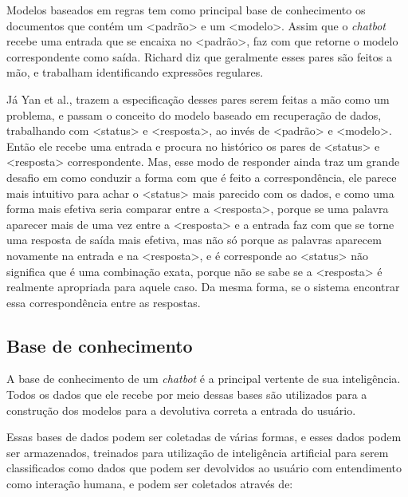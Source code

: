 \documentclass[
	12pt,				%
	oneside,
	a4paper,			%
	english,			%
	french,				%
	spanish,			%
	brazil				%
	]{abntex2}
\begin{document}
Modelos baseados em regras tem como principal base de conhecimento os documentos que contém um <padrão> e um <modelo>. Assim que o \emph{chatbot} recebe uma entrada que se encaixa no <padrão>, faz com que retorne o modelo correspondente como saída. Richard diz que geralmente esses pares são feitos a mão, e trabalham identificando expressões regulares.

Já Yan et al.\supercite{yan-etal-2016-docchat}, trazem a especificação desses pares serem feitas a mão como um problema, e passam o conceito do modelo baseado em recuperação de dados, trabalhando com <status> e <resposta>, ao invés de <padrão> e <modelo>. Então ele recebe uma entrada e procura no histórico os pares de <status> e <resposta> correspondente. Mas, esse modo de responder ainda traz um grande desafio em como conduzir a forma com que é feito a correspondência, ele parece mais intuitivo para achar o <status> mais parecido com os dados, e como uma forma mais efetiva seria comparar entre a <resposta>, porque se uma palavra aparecer mais de uma vez entre a <resposta> e a entrada faz com que se torne uma resposta de saída mais efetiva, mas não só porque as palavras aparecem novamente na entrada e na <resposta>, e é corresponde ao <status> não significa que é uma combinação exata, porque não se sabe se a <resposta> é realmente apropriada para aquele caso. Da mesma forma, se o sistema encontrar essa correspondência entre as respostas.

\subsection{Base de conhecimento}
A base de conhecimento de um \emph{chatbot} é a principal vertente de sua inteligência. Todos os dados que ele recebe por meio dessas bases são utilizados para a construção dos modelos para a devolutiva correta a entrada do usuário.

Essas bases de dados podem ser coletadas de várias formas, e esses dados podem ser armazenados, treinados para utilização de inteligência artificial para serem classificados como dados que podem ser devolvidos ao usuário com entendimento como interação humana, e podem ser coletados através de:
\end{document}
